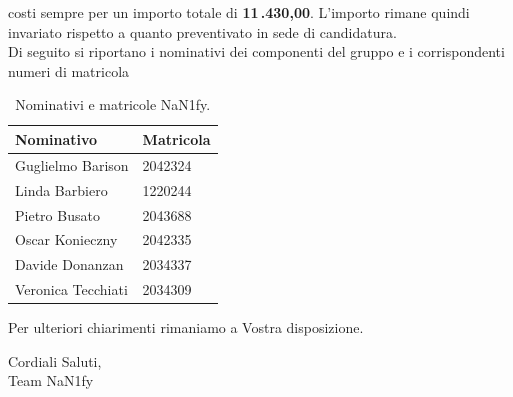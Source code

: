 \documentclass[8pt]{article}
\begin{document}
costi sempre per un importo totale di \textbf{11\,.430,00\;\texteuro}. L’importo rimane quindi invariato
rispetto a quanto preventivato in sede di candidatura.
\vspace{1em}
\\Di seguito si riportano i nominativi dei componenti del gruppo e i corrispondenti numeri di matricola\\
\begin{table}[ht!]
	\centering
	\begin{tabular}{p{3cm} p{3cm}}
		\toprule
		\textbf{Nominativo} & \textbf{Matricola} \\
		\midrule
		Guglielmo Barison & 2042324 \\
		Linda Barbiero &  1220244 \\
		Pietro Busato & 2043688 \\
		Oscar Konieczny & 2042335 \\
		Davide Donanzan & 2034337 \\
		Veronica Tecchiati & 2034309 \\
		\bottomrule
	\end{tabular}
	\caption{Nominativi e matricole NaN1fy.}
	\label{table:Nominativi e matricole NaN1fy}
\end{table}
Per ulteriori chiarimenti rimaniamo a Vostra disposizione.
\vspace{1em}
\begin{flushleft}
	Cordiali Saluti,\\
	Team NaN1fy
\end{flushleft}
\clearpage
\newpage
\justifying
\end{document}
